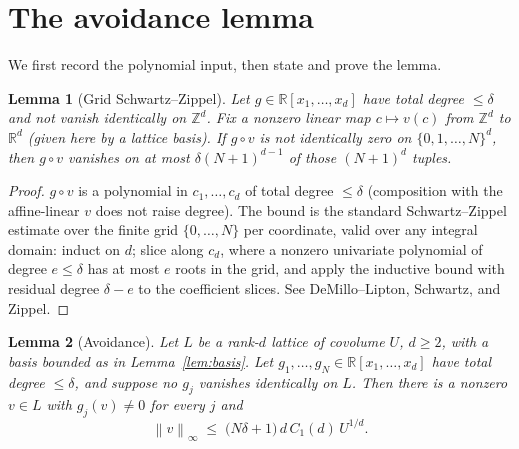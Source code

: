 \documentclass[11pt]{article}
\newtheorem{lemma}{Lemma}
\theoremstyle{definition}
\newcommand{\Z}{\mathbb{Z}}
\newcommand{\R}{\mathbb{R}}
\newcommand{\norm}[1]{\left\lVert #1 \right\rVert}
\begin{document}
\section{The avoidance lemma}

We first record the polynomial input, then state and prove the lemma.

\begin{lemma}[Grid Schwartz--Zippel]\label{lem:sz}
Let $g \in \R[x_1,\dots,x_d]$ have total degree $\le \delta$ and not vanish
identically on $\Z^d$. Fix a nonzero linear map $c \mapsto v(c)$ from $\Z^d$ to
$\R^d$ (given here by a lattice basis). If $g \circ v$ is not identically zero on
$\{0,1,\dots,N\}^d$, then $g \circ v$ vanishes on at most $\delta (N+1)^{d-1}$ of
those $(N+1)^d$ tuples.
\end{lemma}

\begin{proof}
$g \circ v$ is a polynomial in $c_1,\dots,c_d$ of total degree $\le \delta$ (composition
with the affine-linear $v$ does not raise degree). The bound is the standard
Schwartz--Zippel estimate over the finite grid $\{0,\dots,N\}$ per coordinate,
valid over any integral domain: induct on $d$; slice along $c_d$, where a nonzero
univariate polynomial of degree $e \le \delta$ has at most $e$ roots in the grid,
and apply the inductive bound with residual degree $\delta - e$ to the coefficient
slices. See DeMillo--Lipton, Schwartz, and Zippel.
\end{proof}

\begin{lemma}[Avoidance]\label{lem:avoid}
Let $L$ be a rank-$d$ lattice of covolume $U$, $d \ge 2$, with a basis bounded as in
Lemma~\ref{lem:basis}. Let $g_1,\dots,g_N \in \R[x_1,\dots,x_d]$ have total degree
$\le \delta$, and suppose no $g_j$ vanishes identically on $L$. Then there is a
nonzero $v \in L$ with $g_j(v) \ne 0$ for every $j$ and
\[
  \norm{v}_\infty \;\le\; \big(N\delta + 1\big)\, d\, C_1(d)\, U^{1/d}.
\]
\end{lemma}
\end{document}
